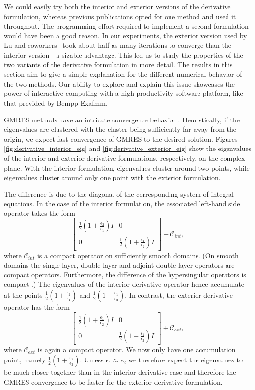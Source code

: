 We could easily try both the interior and exterior versions of the derivative formulation, whereas previous publications opted for one method and used it throughout.
The programming effort required to implement a second formulation would have been a good reason.
In our experiments, the exterior version used by Lu and coworkers~\cite{LuETal2006,LuETal2009,ZhangETal2019} took about half as many iterations to converge than the interior version---a sizable advantage.
This led us to study the properties of the two variants of the derivative formulation in more detail.
The results in this section aim to give a simple explanation for the different numerical behavior of the two methods.
Our ability to explore and explain this issue showcases the power of interactive computing with a high-productivity software platform, like that provided by Bempp-Exafmm.

GMRES methods have an intricate convergence behavior \cite{mark1999a}.
Heuristically, if the eigenvalues are clustered with the cluster being sufficiently far away from the origin, we expect fast convergence of GMRES to the desired solution.
Figures \ref{fig:derivative_interior_eig} and \ref{fig:derivative_exterior_eig} show the eigenvalues of the interior and exterior derivative formulations, respectively, on the complex plane.
With the interior formulation, eigenvalues cluster around two points, while eigenvalues cluster around only one point with the exterior formulation.

The difference is due to the diagonal of the corresponding system of integral equations.
In the case of the interior formulation, the associated left-hand side operator takes the form
$$
\begin{bmatrix}\frac{1}{2}(1 + \frac{\epsilon_2}{\epsilon_1})I & 0 \\ 0 & \frac{1}{2}(1 + \frac{\epsilon_1}{\epsilon_2})I
\end{bmatrix} + \mathcal{C}_{int},
$$
where $\mathcal{C}_{int}$ is a compact operator on sufficiently smooth domains. (On smooth domains the single-layer, double-layer and adjoint double-layer operators are compact operators.
Furthermore, the difference of the hypersingular operators is compact \cite{Hiptmair2006-om}.)
The eigenvalues of the interior derivative operator hence accumulate at the points $\frac{1}{2}(1 + \frac{\epsilon_2}{\epsilon_1})$ and $\frac{1}{2}(1 + \frac{\epsilon_1}{\epsilon_2})$.
In contrast, the exterior derivative operator has the form
$$
\begin{bmatrix}\frac{1}{2}(1 + \frac{\epsilon_1}{\epsilon_2})I & 0 \\ 0 & \frac{1}{2}(1 + \frac{\epsilon_1}{\epsilon_2})I
\end{bmatrix} + \mathcal{C}_{ext},
$$
where $\mathcal{C}_{ext}$ is again a compact operator.
We now only have one accumulation point, namely $\frac{1}{2}(1 + \frac{\epsilon_1}{\epsilon_2})$.
Unless $\epsilon_1\approx \epsilon_2$ we therefore expect the eigenvalues to be much closer together than in the interior derivative case and therefore the GMRES convergence to be faster for the exterior derivative formulation.

